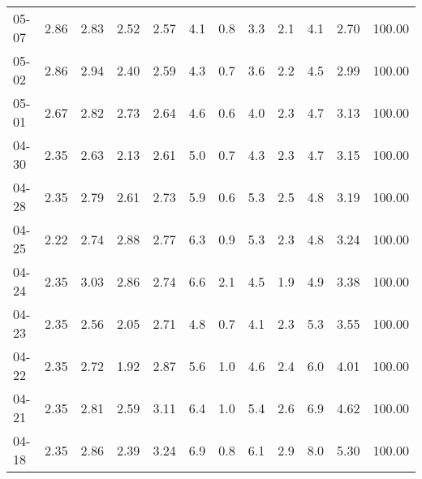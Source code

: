 \begin{threeparttable}
{\begin{tabular}{lrrrrrrrrrrr}
  05-07 &          2.86 &          2.83 &          2.52 &        2.57 &                 4.1 &                 0.8 &        3.3 &                 2.1 &              4.1 &            2.70 &                 100.00 \\
  05-02 &          2.86 &          2.94 &          2.40 &        2.59 &                 4.3 &                 0.7 &        3.6 &                 2.2 &              4.5 &            2.99 &                 100.00 \\
  05-01 &          2.67 &          2.82 &          2.73 &        2.64 &                 4.6 &                 0.6 &        4.0 &                 2.3 &              4.7 &            3.13 &                 100.00 \\
  04-30 &          2.35 &          2.63 &          2.13 &        2.61 &                 5.0 &                 0.7 &        4.3 &                 2.3 &              4.7 &            3.15 &                 100.00 \\
  04-28 &          2.35 &          2.79 &          2.61 &        2.73 &                 5.9 &                 0.6 &        5.3 &                 2.5 &              4.8 &            3.19 &                 100.00 \\
  04-25 &          2.22 &          2.74 &          2.88 &        2.77 &                 6.3 &                 0.9 &        5.3 &                 2.3 &              4.8 &            3.24 &                 100.00 \\
  04-24 &          2.35 &          3.03 &          2.86 &        2.74 &                 6.6 &                 2.1 &        4.5 &                 1.9 &              4.9 &            3.38 &                 100.00 \\
  04-23 &          2.35 &          2.56 &          2.05 &        2.71 &                 4.8 &                 0.7 &        4.1 &                 2.3 &              5.3 &            3.55 &                 100.00 \\
  04-22 &          2.35 &          2.72 &          1.92 &        2.87 &                 5.6 &                 1.0 &        4.6 &                 2.4 &              6.0 &            4.01 &                 100.00 \\
  04-21 &          2.35 &          2.81 &          2.59 &        3.11 &                 6.4 &                 1.0 &        5.4 &                 2.6 &              6.9 &            4.62 &                 100.00 \\
  04-18 &          2.35 &          2.86 &          2.39 &        3.24 &                 6.9 &                 0.8 &        6.1 &                 2.9 &              8.0 &            5.30 &                 100.00 \\

\end{tabular}}
\end{threeparttable}
